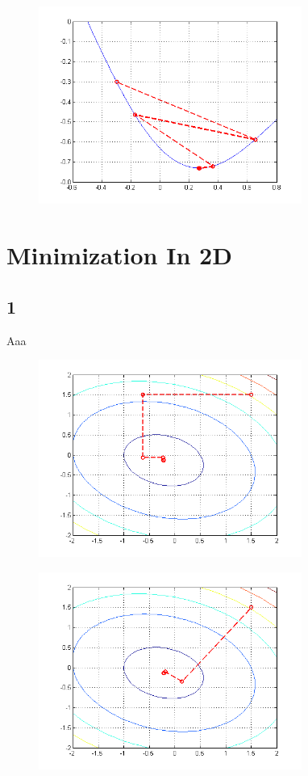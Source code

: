 \documentclass[journal]{IEEEtran}
\begin{document}
\begin{figure}
\centering
\includegraphics[width=3.4in]{figures/1d-newtonsMethod.png}
\caption{}
\label{figNM}
\end{figure}


\section{Minimization In 2D}

\subsection{1}

Aaa

\begin{figure}
\centering
\includegraphics[width=3.4in]{figures/2d-arbitraryLineSearch.png}
\caption{}
\label{figALS}
\end{figure}

\begin{figure}
\centering
\includegraphics[width=3.4in]{figures/2d-steepestDescent.png}
\caption{}
\label{figSD}
\end{figure}
\end{document}
